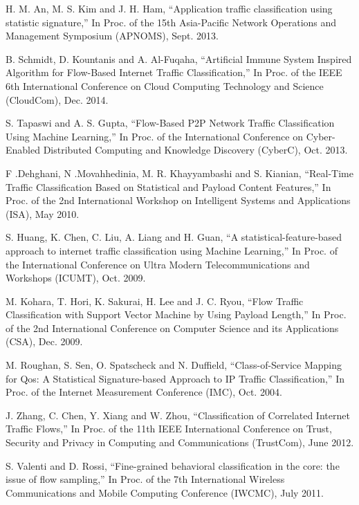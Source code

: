 \begin{thebibliography}{1}
H. M. An, M. S. Kim and J. H. Ham,
``Application traffic classification using statistic signature,'' In Proc. of the 15th Asia-Pacific Network Operations and Management Symposium (APNOMS), Sept. 2013.

B. Schmidt, D. Kountanis and A. Al-Fuqaha, 
``Artificial Immune System Inspired Algorithm for Flow-Based Internet Traffic Classification,'' In Proc. of the IEEE 6th International Conference on Cloud Computing Technology and Science (CloudCom), Dec. 2014. 

S. Tapaswi and A. S. Gupta,
``Flow-Based P2P Network Traffic Classification Using Machine Learning,'' In Proc. of the International Conference on Cyber-Enabled Distributed Computing and Knowledge Discovery (CyberC), Oct. 2013. 

F .Dehghani, N .Movahhedinia, M. R. Khayyambashi and S. Kianian, 
``Real-Time Traffic Classification Based on Statistical and Payload Content Features,'' In Proc. of the 2nd International Workshop on Intelligent Systems and Applications (ISA), May 2010. 

S. Huang, K. Chen, C. Liu, A. Liang and H. Guan,
``A statistical-feature-based approach to internet traffic classification using Machine Learning,'' In Proc. of the International Conference on Ultra Modern Telecommunications and Workshops (ICUMT), Oct. 2009. 

M. Kohara, T. Hori, K. Sakurai, H. Lee and J. C. Ryou,
``Flow Traffic Classification with Support Vector Machine by Using Payload Length,'' In Proc. of the 2nd International Conference on Computer Science and its Applications (CSA), Dec. 2009.  

M. Roughan, S. Sen, O. Spatscheck and N. Duffield, 
``Class-of-Service Mapping for Qos: A Statistical Signature-based Approach to IP Traffic Classification,'' In Proc. of the Internet Measurement Conference (IMC), Oct. 2004.

J. Zhang, C. Chen, Y. Xiang and W. Zhou, 
``Classification of Correlated Internet Traffic Flows,'' In Proc. of the 11th IEEE International Conference on Trust, Security and Privacy in Computing and Communications (TrustCom), June 2012.

S. Valenti and D. Rossi, 
``Fine-grained behavioral classification in the core: the issue of flow sampling,'' In Proc. of the 7th International Wireless Communications and Mobile Computing Conference (IWCMC), July 2011.
 

\end{thebibliography}
